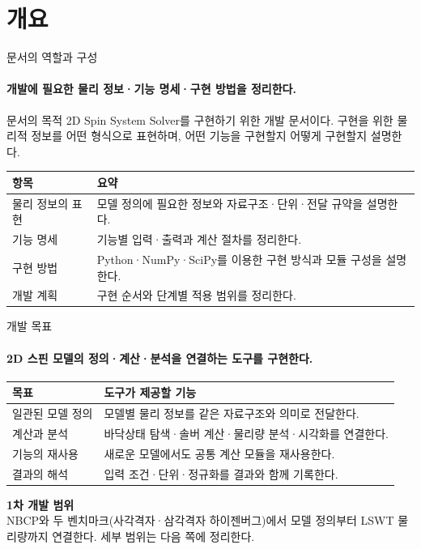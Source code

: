 \section[개요]{개요}

\begin{frame}[plain,label=section-overview]
  \sectionpage
\end{frame}

\begin{frame}[label=document-purpose]{문서의 역할과 구성}
  \framesubtitle{개발에 필요한 물리 정보·기능 명세·구현 방법을 정리한다.}
  \begin{block}{문서의 목적}
    2D Spin System Solver를 구현하기 위한 개발 문서이다.
    구현을 위한 물리적 정보를 어떤 형식으로 표현하며, 어떤 기능을 구현할지 어떻게 구현할지 설명한다.
  \end{block}
  \par\medskip
  \begin{tabularx}{\textwidth}{@{}p{2.8cm}Y@{}}
    \toprule
    항목 & 요약 \\
    \midrule
    물리 정보의 표현 & 모델 정의에 필요한 정보와 자료구조·단위·전달 규약을 설명한다. \\
    기능 명세 & 기능별 입력·출력과 계산 절차를 정리한다. \\
    구현 방법 & Python·NumPy·SciPy를 이용한 구현 방식과 모듈 구성을 설명한다. \\
    개발 계획 & 구현 순서와 단계별 적용 범위를 정리한다. \\
    \bottomrule
  \end{tabularx}
  \par\medskip
\end{frame}

\begin{frame}[label=development-goals]{개발 목표}
  \framesubtitle{2D 스핀 모델의 정의·계산·분석을 연결하는 도구를 구현한다.}
  \begin{tabularx}{\textwidth}{@{}p{2.7cm}Y@{}}
    \toprule
    목표 & 도구가 제공할 기능 \\
    \midrule
    일관된 모델 정의 & 모델별 물리 정보를 같은 자료구조와 의미로 전달한다. \\
    계산과 분석 & 바닥상태 탐색·솔버 계산·물리량 분석·시각화를 연결한다. \\
    기능의 재사용 & 새로운 모델에서도 공통 계산 모듈을 재사용한다. \\
    결과의 해석 & 입력 조건·단위·정규화를 결과와 함께 기록한다. \\
    \bottomrule
  \end{tabularx}
  \par\medskip
  \textbf{1차 개발 범위}\\[0.4em]
  NBCP와 두 벤치마크(사각격자·삼각격자 하이젠버그)에서 모델 정의부터
  LSWT 물리량까지 연결한다. 세부 범위는 다음 쪽에 정리한다.
  \par\medskip
\end{frame}

